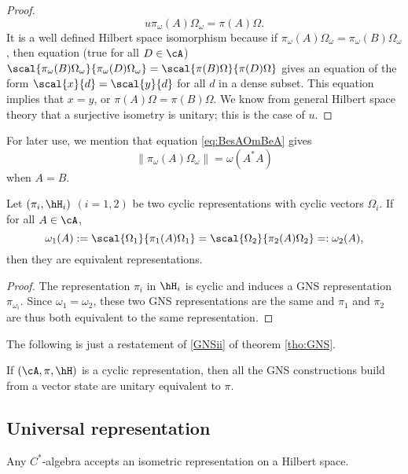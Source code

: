\begin{proof}
\[ 
  u\pi_{\omega}(A)\Omega_{\omega}=\pi(A)\Omega.
\]
It is a well defined Hilbert space isomorphism because if $\pi_{\omega}(A)\Omega_{\omega}=\pi_{\omega}(B)\Omega_{\omega}$, then equation (true for all $D\in\cA$) $\scal{\pi_{\omega}(B)\Omega_{\omega}}{\pi_{\omega}(D)\Omega_{\omega}}=\scal{\pi(B)\Omega}{\pi(D)\Omega}$ gives an equation of the form $\scal{x}{d}=\scal{y}{d}$ for all $d$ in a dense subset. This equation implies that $x=y$, or $\pi(A)\Omega=\pi(B)\Omega$. We know from general Hilbert space theory that a surjective isometry is unitary; this is the case of $u$.

\end{proof}

For later use, we mention that equation \eqref{eq:BesAOmBeA} gives
\begin{equation}  \label{eq:piomomaesm}
\| \pi_{\omega}(A)\Omega_{\omega} \|=\omega(A^*A)
\end{equation}
when $A=B$.

\begin{corollary}
Let $(\pi_i,\hH_i)$ $(i=1,2)$ be two cyclic representations with cyclic vectors $\Omega_i$. If for all $A\in\cA$, 
\[ 
  \omega_1(A):=\scal{\Omega_1}{\pi_1(A)\Omega_1}=\scal{\Omega_2}{\pi_2(A)\Omega_2}=:\omega_2(A),
\]
then they are equivalent representations.

\end{corollary}

\begin{proof}
The representation $\pi_i$ in $\hH_i$ is cyclic and induces a GNS representation $\pi_{\omega_i}$. Since $\omega_1=\omega_2$, these two GNS representations are the same and $\pi_1$ and $\pi_2$ are thus both equivalent to the same representation.

\end{proof}

The following is just a restatement of \ref{GNSii} of theorem \ref{tho:GNS}.
\begin{proposition}
If $(\cA,\pi,\hH)$ is a cyclic representation, then all the GNS constructions build from a vector state are unitary equivalent to $\pi$. \label{prop:cyclequivGNS}
\end{proposition}


\subsection{Universal representation}

\begin{theorem}
Any $C^*$-algebra accepts an isometric representation on a Hilbert space.
\end{theorem}


